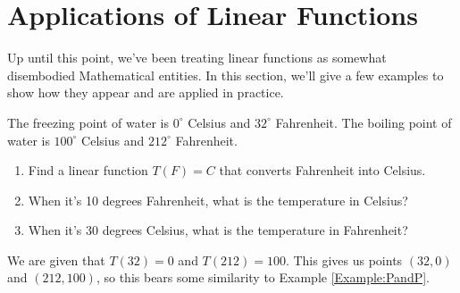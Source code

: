 \section{Applications of Linear Functions}

Up until this point, we've been treating linear functions as somewhat disembodied Mathematical entities.  In this section, we'll give a few examples to show how they appear and are applied in practice.


\begin{example}\label{Example:LinearTemp}

\Q The freezing point of water is $0^\circ$ Celsius and $32^\circ$ Fahrenheit.  The boiling point of water is $100^\circ$ Celsius and $212^\circ$ Fahrenheit.

\begin{enumerate}
    \item Find a linear function $T(F)=C$ that converts Fahrenheit into Celsius.
    \item When it's 10 degrees Fahrenheit, what is the temperature in Celsius?
    \item When it's 30 degrees Celsius, what is the temperature in Fahrenheit?
\end{enumerate}

\Sol We are given that $T(32)=0$ and $T(212)=100$.  This gives us points $(32,0)$ and $(212,100)$, so this bears some similarity to Example \ref{Example:PandP}.

\end{example}
